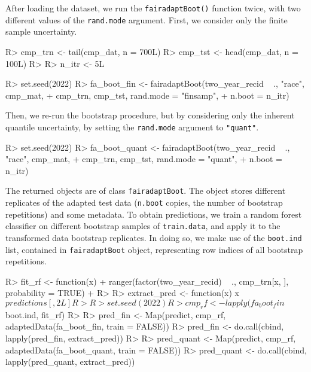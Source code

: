 \documentclass[
  nojss]{jss}
\begin{document}
After loading the dataset, we run the \texttt{fairadaptBoot()} function
twice, with two different values of the \texttt{rand.mode} argument.
First, we consider only the finite sample uncertainty.

\begin{CodeChunk}
\begin{CodeInput}
R> cmp_trn <- tail(cmp_dat, n = 700L)
R> cmp_tst <- head(cmp_dat, n = 100L)
R> 
R> n_itr <- 5L
\end{CodeInput}
\end{CodeChunk}

\begin{CodeChunk}
\begin{CodeInput}
R> set.seed(2022)
R> fa_boot_fin <- fairadaptBoot(two_year_recid ~ ., "race", cmp_mat,
+                              cmp_trn, cmp_tst, rand.mode = "finsamp",
+                              n.boot = n_itr)
\end{CodeInput}
\end{CodeChunk}

Then, we re-run the bootstrap procedure, but by considering only the
inherent quantile uncertainty, by setting the \texttt{rand.mode}
argument to \texttt{"quant"}.

\begin{CodeChunk}
\begin{CodeInput}
R> set.seed(2022)
R> fa_boot_quant <- fairadaptBoot(two_year_recid ~ ., "race", cmp_mat,
+                                cmp_trn, cmp_tst, rand.mode = "quant",
+                                n.boot = n_itr)
\end{CodeInput}
\end{CodeChunk}

The returned objects are of class \texttt{fairadaptBoot}. The object
stores different replicates of the adapted test data (\texttt{n.boot}
copies, the number of bootstrap repetitions) and some metadata. To
obtain predictions, we train a random forest classifier on different
bootstrap samples of \texttt{train.data}, and apply it to the
transformed data bootstrap replicates. In doing so, we make use of the
\texttt{boot.ind} list, contained in \texttt{fairadaptBoot} object,
representing row indices of all bootstrap repetitions.

\begin{CodeChunk}
\begin{CodeInput}
R> fit_rf <- function(x) {
+   ranger(factor(two_year_recid) ~ ., cmp_trn[x, ], probability = TRUE)
+ }
R> 
R> extract_pred <- function(x) x$predictions[, 2L]
R> 
R> set.seed(2022)
R> cmp_rf <- lapply(fa_boot_fin$boot.ind, fit_rf)
R> 
R> pred_fin <- Map(predict, cmp_rf, adaptedData(fa_boot_fin, train = FALSE)) 
R> pred_fin <- do.call(cbind, lapply(pred_fin, extract_pred))
R> 
R> pred_quant <- Map(predict, cmp_rf, adaptedData(fa_boot_quant, train = FALSE))
R> pred_quant <- do.call(cbind, lapply(pred_quant, extract_pred))
\end{CodeInput}
\end{CodeChunk}
\end{document}
